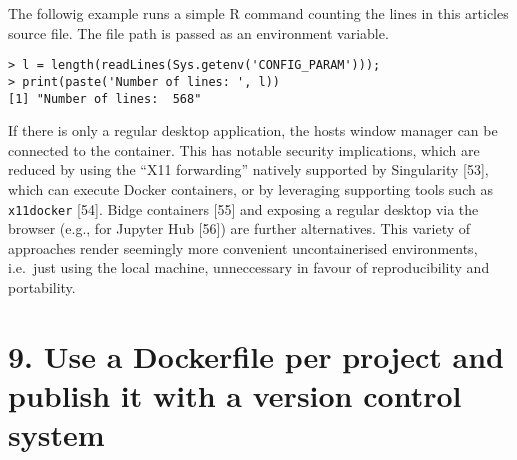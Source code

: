 \documentclass[10pt,letterpaper]{article}
\newenvironment{Shaded}{\begin{snugshade}}{\end{snugshade}}
\newcommand{\BuiltInTok}[1]{#1}
\newcommand{\ExtensionTok}[1]{#1}
\newcommand{\NormalTok}[1]{#1}
\newcommand{\StringTok}[1]{\textcolor[rgb]{0.31,0.60,0.02}{#1}}
\newcommand{\VariableTok}[1]{\textcolor[rgb]{0.00,0.00,0.00}{#1}}
\begin{document}
The followig example runs a simple R command counting the lines in this
articles source file. The file path is passed as an environment
variable.

\begin{Shaded}
\end{Shaded}

\begin{verbatim}
> l = length(readLines(Sys.getenv('CONFIG_PARAM')));
> print(paste('Number of lines: ', l))
[1] "Number of lines:  568"
\end{verbatim}

If there is only a regular desktop application, the hosts window manager
can be connected to the container. This has notable security
implications, which are reduced by using the ``X11 forwarding'' natively
supported by Singularity {[}53{]}, which can execute Docker containers,
or by leveraging supporting tools such as \texttt{x11docker} {[}54{]}.
Bidge containers {[}55{]} and exposing a regular desktop via the browser
(e.g., for Jupyter Hub {[}56{]}) are further alternatives. This variety
of approaches render seemingly more convenient uncontainerised
environments, i.e.~just using the local machine, unneccessary in favour
of reproducibility and portability.

\hypertarget{use-a-dockerfile-per-project-and-publish-it-with-a-version-control-system}{%
\section*{9. Use a Dockerfile per project and publish it with a version
control
system}\label{use-a-dockerfile-per-project-and-publish-it-with-a-version-control-system}}

  \label{rule:publish} 
\end{document}
